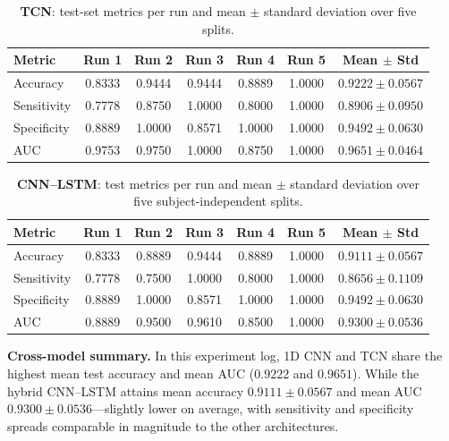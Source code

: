 \documentclass{article}
\begin{document}
\begin{table}[ht]
  \caption{\textbf{TCN}: test-set metrics per run and mean $\pm$ standard deviation over five splits.}
  \label{tab:results-tcn}
  \centering
  \footnotesize
  \setlength{\tabcolsep}{4pt}
  \begin{tabular}{l ccccc c}
    \toprule
    Metric & Run 1 & Run 2 & Run 3 & Run 4 & Run 5 & Mean $\pm$ Std \\
    \midrule
    Accuracy    & 0.8333 & 0.9444 & 0.9444 & 0.8889 & 1.0000 & $0.9222 \pm 0.0567$ \\
    Sensitivity & 0.7778 & 0.8750 & 1.0000 & 0.8000 & 1.0000 & $0.8906 \pm 0.0950$ \\
    Specificity & 0.8889 & 1.0000 & 0.8571 & 1.0000 & 1.0000 & $0.9492 \pm 0.0630$ \\
    AUC         & 0.9753 & 0.9750 & 1.0000 & 0.8750 & 1.0000 & $0.9651 \pm 0.0464$ \\
    \bottomrule
  \end{tabular}
\end{table}

\begin{table}[ht]
  \caption{\textbf{CNN--LSTM}: test metrics per run and mean $\pm$ standard deviation over five subject-independent splits.}
  \label{tab:results-cnnlstm}
  \centering
  \footnotesize
  \setlength{\tabcolsep}{4pt}
  \begin{tabular}{l ccccc c}
    \toprule
    Metric & Run 1 & Run 2 & Run 3 & Run 4 & Run 5 & Mean $\pm$ Std \\
    \midrule
    Accuracy    & 0.8333 & 0.8889 & 0.9444 & 0.8889 & 1.0000 & $0.9111 \pm 0.0567$ \\
    Sensitivity & 0.7778 & 0.7500 & 1.0000 & 0.8000 & 1.0000 & $0.8656 \pm 0.1109$ \\
    Specificity & 0.8889 & 1.0000 & 0.8571 & 1.0000 & 1.0000 & $0.9492 \pm 0.0630$ \\
    AUC         & 0.8889 & 0.9500 & 0.9610 & 0.8500 & 1.0000 & $0.9300 \pm 0.0536$ \\
    \bottomrule
  \end{tabular}
\end{table}

\textbf{Cross-model summary.} In this experiment log, 1D CNN and TCN share the highest mean test accuracy and mean AUC ($0.9222$ and $0.9651$). While the hybrid CNN--LSTM attains mean accuracy $0.9111 \pm 0.0567$ and mean AUC $0.9300 \pm 0.0536$---slightly lower on average, with sensitivity and specificity spreads comparable in magnitude to the other architectures.
\end{document}
